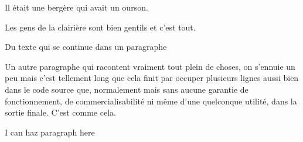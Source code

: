 \documentclass[a4paper,font=12pt]{article}
\begin{document}

Il était une bergère \patapon
qui avait un ourson.

Les gens de la clairière sont bien gentils et c'est tout.%

Du texte
qui se continue dans un paragraphe


Un autre paragraphe qui racontent vraiment tout plein de choses, on
s'ennuie un peu mais c'est tellement long que cela finit par occuper
plusieurs lignes aussi bien dans le code source que, normalement mais
sans aucune garantie de fonctionnement, de commercialisabilité ni même
d'une quelconque utilité, dans la sortie finale. C'est comme cela.

\begin{itemize}%
\begin{itemize}

\end{itemize}

\end{itemize}

I can haz paragraph here
\begin{itemize}

\end{itemize}
\end{document}
